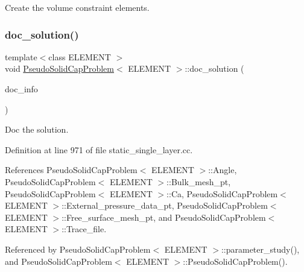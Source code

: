 Create the volume constraint elements. 

\mbox{\label{classPseudoSolidCapProblem_a2fb98a37bde5742cbdf3c91cb1f5eb2f}} 
\subsubsection{\texorpdfstring{doc\+\_\+solution()}{doc\_solution()}\hspace{0.1cm}{\footnotesize\ttfamily [1/2]}}
{\footnotesize\ttfamily template$<$class E\+L\+E\+M\+E\+NT $>$ \\
void \hyperlink{classPseudoSolidCapProblem}{Pseudo\+Solid\+Cap\+Problem}$<$ E\+L\+E\+M\+E\+NT $>$\+::doc\+\_\+solution (\begin{DoxyParamCaption}\item[{Doc\+Info \&}]{doc\+\_\+info }\end{DoxyParamCaption})}



Doc the solution. 



Definition at line 971 of file static\+\_\+single\+\_\+layer.\+cc.



References Pseudo\+Solid\+Cap\+Problem$<$ E\+L\+E\+M\+E\+N\+T $>$\+::\+Angle, Pseudo\+Solid\+Cap\+Problem$<$ E\+L\+E\+M\+E\+N\+T $>$\+::\+Bulk\+\_\+mesh\+\_\+pt, Pseudo\+Solid\+Cap\+Problem$<$ E\+L\+E\+M\+E\+N\+T $>$\+::\+Ca, Pseudo\+Solid\+Cap\+Problem$<$ E\+L\+E\+M\+E\+N\+T $>$\+::\+External\+\_\+pressure\+\_\+data\+\_\+pt, Pseudo\+Solid\+Cap\+Problem$<$ E\+L\+E\+M\+E\+N\+T $>$\+::\+Free\+\_\+surface\+\_\+mesh\+\_\+pt, and Pseudo\+Solid\+Cap\+Problem$<$ E\+L\+E\+M\+E\+N\+T $>$\+::\+Trace\+\_\+file.



Referenced by Pseudo\+Solid\+Cap\+Problem$<$ E\+L\+E\+M\+E\+N\+T $>$\+::parameter\+\_\+study(), and Pseudo\+Solid\+Cap\+Problem$<$ E\+L\+E\+M\+E\+N\+T $>$\+::\+Pseudo\+Solid\+Cap\+Problem().

\mbox{\label{classPseudoSolidCapProblem_a2fb98a37bde5742cbdf3c91cb1f5eb2f}} 
